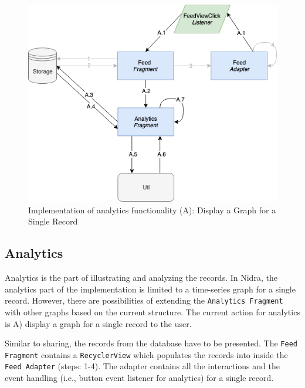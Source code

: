 




\begin{figure}
    \centering
    \includegraphics[scale=0.6]{images/Anal_Imp.png}
    \caption{Implementation of analytics functionality (A): Display a Graph for a Single Record}
    \label{fig:impl_analytics}
\end{figure}

\subsection{Analytics}
Analytics is the part of illustrating and analyzing the records. In Nidra, the analytics part of the implementation is limited to a time-series graph for a single record. However, there are possibilities of extending the \verb|Analytics Fragment| with other graphs based on the current structure. The current action for analytics is A) display a graph for a single record to the user. 

Similar to sharing, the records from the database have to be presented. The \verb|Feed Fragment| contains a \verb|RecyclerView| which populates the records into inside the \verb|Feed Adapter| (steps: 1-4). The adapter contains all the interactions and the event handling (i.e., button event listener for analytics) for a single record. 

